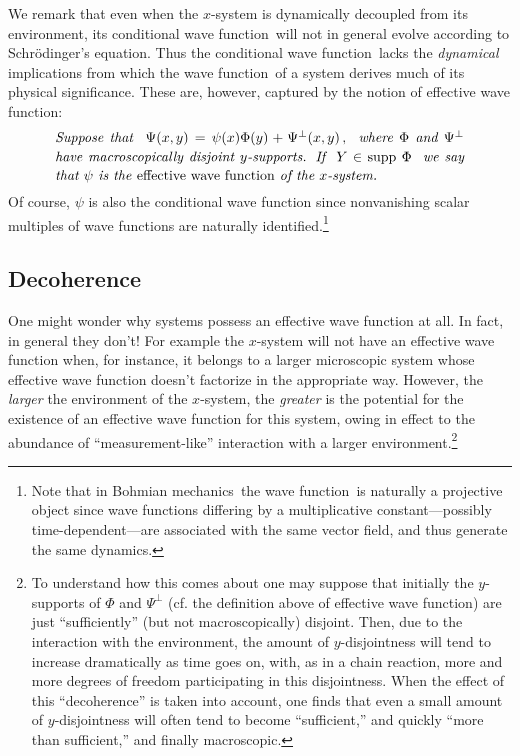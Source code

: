 \documentclass[12pt]{article}
\newcommand{\Sc}{Schr\"{o}dinger}
\newcommand{\BM}{Bohmian mechanics}
\newcommand{\wf}{wave function}
\newcommand{\ewf}{effective wave function}
\newcommand{\cwf}{conditional wave function}
\begin{document}
We remark that even when the $x$-system is dynamically decoupled
{}from its environment, its conditional \wf\ will not in general
evolve according to \Sc's equation. Thus the conditional \wf\ lacks
the {\it dynamical} implications {}from which the \wf\ of a system
derives much of its physical significance. These are, however,
captured by the notion of \ewf:
\begin{equation}
\mbox{%
\begin{minipage}{0.85\textwidth}\openup 1.2\jot
   \setlength{\baselineskip}{12pt}\emph{Suppose that $\;\Psi(x,y) =
     \psi(x)\Phi(y) + \Psi^{\perp}(x,y)\, ,\;$ where $\Phi$ and
     $\Psi^{\perp}$ have macroscopically disjoint $y$-supports.  If $\;
     Y \in \hbox{\rm supp}\;\Phi \;$ we say that $\psi$ is the
     \emph{\ewf} of the $x$-system.}
\end{minipage}}
\label{def:ewf}
\end{equation}
Of course, $\psi$ is also the \cwf{} since nonvanishing scalar
multiples of \wf s are naturally
identified.\footnote{\label{foosti}Note that in \BM\ the \wf\ is
   naturally a projective object since \wf s differing by a
   multiplicative constant---possibly time-dependent---are associated
   with the same vector field, and thus generate the same dynamics.  }


\subsection{Decoherence}
\label{sec:DD}

One might wonder why systems possess an effective wave function at
all.  In fact, in general they don't!  For example the $x$-system will
not have an \ewf{} when, for instance, it belongs to a larger
microscopic system whose \ewf{} doesn't factorize in the appropriate
way.  However, the \emph{larger} the environment of the $x$-system,
the \emph{greater} is the potential for the existence of an \ewf{} for
this system, owing in effect to the abundance of ``measurement-like''
interaction with a larger environment.\footnote{To understand how this
   comes about one may suppose that initially the $y$-supports of
   $\Phi$ and $\Psi^{\perp}$ (cf.  the definition above of effective
   \wf{}) are just ``sufficiently'' (but not macroscopically) disjoint.
   Then, due to the interaction with the environment, the amount of
   $y$-disjointness will tend to increase dramatically as time goes on,
   with, as in a chain reaction, more and more degrees of freedom
   participating in this disjointness.  When the effect of this
   ``decoherence'' is taken into account, one finds that even a small
   amount of $y$-disjointness will often tend to become ``sufficient,''
   and quickly ``more than sufficient,'' and finally macroscopic.}
\end{document}
